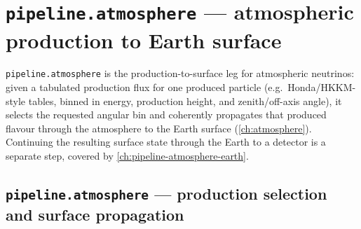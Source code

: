 \chapter{\texttt{pipeline.atmosphere} --- atmospheric production to Earth surface}
\label{ch:pipeline-atmosphere}

\texttt{pipeline.atmosphere} is the production-to-surface leg for
atmospheric neutrinos: given a tabulated production flux for one produced
particle (e.g.\ Honda/HKKM-style tables, binned in energy, production
height, and zenith/off-axis angle), it selects the requested angular bin
and coherently propagates that produced flavour through the atmosphere to
the Earth surface (\cref{ch:atmosphere}). Continuing the resulting surface
state through the Earth to a detector is a separate step, covered by
\cref{ch:pipeline-atmosphere-earth}.

\section{\texttt{pipeline.atmosphere} --- production selection and surface propagation}


